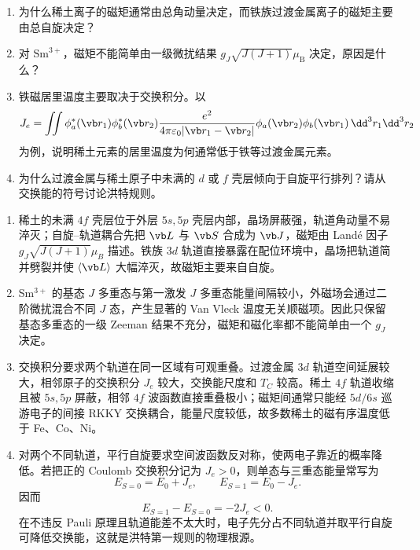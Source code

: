 \begin{question}[10 分]
\begin{enumerate}
  \item 为什么稀土离子的磁矩通常由总角动量决定，而铁族过渡金属离子的磁矩主要由总自旋决定？
  \item 对 $\mathrm{Sm}^{3+}$，磁矩不能简单由一级微扰结果 $g_J\sqrt{J(J+1)}\mu_{\mathrm B}$ 决定，原因是什么？
  \item 铁磁居里温度主要取决于交换积分。以
  \[
  J_e=\iint \phi_a^*(\vb r_1)\phi_b^*(\vb r_2)
  \frac{e^2}{4\pi\varepsilon_0\lvert\vb r_1-\vb r_2\rvert}
  \phi_a(\vb r_2)\phi_b(\vb r_1)\,\dd^3r_1\dd^3r_2
  \]
  为例，说明稀土元素的居里温度为何通常低于铁等过渡金属元素。
  \item 为什么过渡金属与稀土原子中未满的 $d$ 或 $f$ 壳层倾向于自旋平行排列？请从交换能的符号讨论洪特规则。
\end{enumerate}


\begin{solution}
\begin{enumerate}
  \item 稀土的未满 $4f$ 壳层位于外层 $5s,5p$ 壳层内部，晶场屏蔽强，轨道角动量不易淬灭；自旋--轨道耦合先把 $\vb L$ 与 $\vb S$ 合成为 $\vb J$，磁矩由 Land\'e 因子 $g_J\sqrt{J(J+1)}\mu_B$ 描述。铁族 $3d$ 轨道直接暴露在配位环境中，晶场把轨道简并劈裂并使 $\langle\vb L\rangle$ 大幅淬灭，故磁矩主要来自自旋。
  \item Sm$^{3+}$ 的基态 $J$ 多重态与第一激发 $J$ 多重态能量间隔较小，外磁场会通过二阶微扰混合不同 $J$ 态，产生显著的 Van Vleck 温度无关顺磁项。因此只保留基态多重态的一级 Zeeman 结果不充分，磁矩和磁化率都不能简单由一个 $g_J$ 决定。
  \item 交换积分要求两个轨道在同一区域有可观重叠。过渡金属 $3d$ 轨道空间延展较大，相邻原子的交换积分 $J_e$ 较大，交换能尺度和 $T_C$ 较高。稀土 $4f$ 轨道收缩且被 $5s,5p$ 屏蔽，相邻 $4f$ 波函数直接重叠极小；磁矩间通常只能经 $5d/6s$ 巡游电子的间接 RKKY 交换耦合，能量尺度较低，故多数稀土的磁有序温度低于 Fe、Co、Ni。
  \item 对两个不同轨道，平行自旋要求空间波函数反对称，使两电子靠近的概率降低。若把正的 Coulomb 交换积分记为 $J_e>0$，则单态与三重态能量常写为
  \[
    E_{S=0}=E_0+J_e,
    \qquad E_{S=1}=E_0-J_e.
  \]
  因而
  \[
    E_{S=1}-E_{S=0}=-2J_e<0.
  \]
  在不违反 Pauli 原理且轨道能差不太大时，电子先分占不同轨道并取平行自旋可降低交换能，这就是洪特第一规则的物理根源。
\end{enumerate}
\end{solution}
\end{question}

